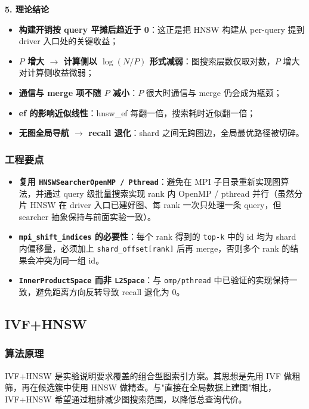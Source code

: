 \documentclass[a4paper]{article}
\begin{document}
\textbf{5. 理论结论}
\begin{itemize}
    \item \textbf{构建开销按 query 平摊后趋近于 0}：这正是把 HNSW 构建从 per-query 提到 driver 入口处的关键收益；
    \item \textbf{$P$ 增大 $\rightarrow$ 计算侧以 $\log(N/P)$ 形式减弱}：图搜索层数仅取对数，$P$ 增大对计算侧收益微弱；
    \item \textbf{通信与 merge 项不随 $P$ 减小}：$P$ 很大时通信与 merge 仍会成为瓶颈；
    \item \textbf{ef 的影响近似线性}：hnsw\_ef 每翻一倍，搜索耗时近似翻一倍；
    \item \textbf{无图全局导航 $\rightarrow$ recall 退化}：shard 之间无跨图边，全局最优路径被切碎。
\end{itemize}

\subsubsection{工程要点}
\begin{itemize}
    \item \textbf{复用 \texttt{HNSWSearcherOpenMP / Pthread}}：避免在 MPI 子目录重新实现图算法，并通过 query 级批量搜索实现 rank 内 OpenMP / pthread 并行（虽然分片 HNSW 在 driver 入口已建好图、每 rank 一次只处理一条 query，但 searcher 抽象保持与前面实验一致）。
    \item \textbf{\texttt{mpi\_shift\_indices} 的必要性}：每个 rank 得到的 \texttt{top-k} 中的 id 均为 shard 内偏移量，必须加上 \texttt{shard\_offset[rank]} 后再 merge，否则多个 rank 的结果会冲突为同一组 id。
    \item \textbf{\texttt{InnerProductSpace} 而非 \texttt{L2Space}}：与 \texttt{omp/pthread} 中已验证的实现保持一致，避免距离方向反转导致 recall 退化为 0。
\end{itemize}

\subsection{IVF+HNSW}

\subsubsection{算法原理}

IVF+HNSW 是实验说明要求覆盖的组合型图索引方案。其思想是先用 IVF 做粗筛，再在候选簇中使用 HNSW 做精查。与"直接在全局数据上建图"相比，IVF+HNSW 希望通过粗排减少图搜索范围，以降低总查询代价。
\end{document}
